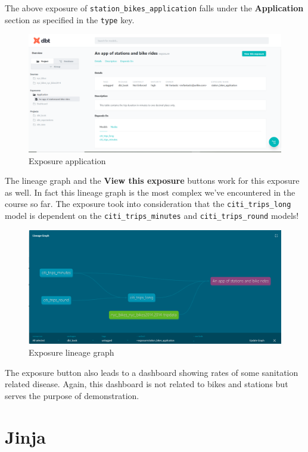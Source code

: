 \documentclass[
]{book}
\begin{document}
The above exposure of \texttt{station\_bikes\_application} falls under the \textbf{Application} section as specified in the \texttt{type} key.

\begin{figure}
\centering
\includegraphics{./images/exposure_application.png}
\caption{Exposure application}
\end{figure}

The lineage graph and the \textbf{View this exposure} buttons work for this exposure as well. In fact this lineage graph is the most complex we've encountered in the course so far. The exposure took into consideration that the \texttt{citi\_trips\_long} model is dependent on the \texttt{citi\_trips\_minutes} and \texttt{citi\_trips\_round} models!

\begin{figure}
\centering
\includegraphics{./images/exposure_lineage_graph2.png}
\caption{Exposure lineage graph}
\end{figure}

The exposure button also leads to a dashboard showing rates of some sanitation related disease. Again, this dashboard is not related to bikes and stations but serves the purpose of demonstration.

\hypertarget{jinja}{%
\chapter{Jinja}\label{jinja}}
\end{document}
